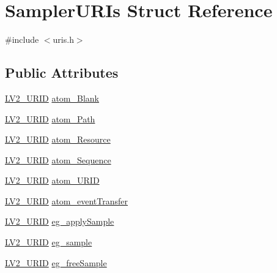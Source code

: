 \hypertarget{struct_sampler_u_r_is}{}\section{Sampler\+U\+R\+Is Struct Reference}
\label{struct_sampler_u_r_is}


{\ttfamily \#include $<$uris.\+h$>$}

\subsection*{Public Attributes}
\begin{DoxyCompactItemize}
\item 
\hyperlink{urid_8h_a5ff0630d245539e9f6dca10ff3c40fae}{L\+V2\+\_\+\+U\+R\+ID} \hyperlink{struct_sampler_u_r_is_a700696fb7f3df0b50fef56e3d120e373}{atom\+\_\+\+Blank}
\item 
\hyperlink{urid_8h_a5ff0630d245539e9f6dca10ff3c40fae}{L\+V2\+\_\+\+U\+R\+ID} \hyperlink{struct_sampler_u_r_is_afb869f2730563a38bffc0f295f8d8045}{atom\+\_\+\+Path}
\item 
\hyperlink{urid_8h_a5ff0630d245539e9f6dca10ff3c40fae}{L\+V2\+\_\+\+U\+R\+ID} \hyperlink{struct_sampler_u_r_is_ae9a6aa805ad14736e989a54a1daa5eff}{atom\+\_\+\+Resource}
\item 
\hyperlink{urid_8h_a5ff0630d245539e9f6dca10ff3c40fae}{L\+V2\+\_\+\+U\+R\+ID} \hyperlink{struct_sampler_u_r_is_abd1b15c33f02305b083915e452eb42b1}{atom\+\_\+\+Sequence}
\item 
\hyperlink{urid_8h_a5ff0630d245539e9f6dca10ff3c40fae}{L\+V2\+\_\+\+U\+R\+ID} \hyperlink{struct_sampler_u_r_is_a1cd02c8907b3fd7fcad0de0f24ef6d4a}{atom\+\_\+\+U\+R\+ID}
\item 
\hyperlink{urid_8h_a5ff0630d245539e9f6dca10ff3c40fae}{L\+V2\+\_\+\+U\+R\+ID} \hyperlink{struct_sampler_u_r_is_adcfc60f5f0d554e48eb3f19e3f1e4e9f}{atom\+\_\+event\+Transfer}
\item 
\hyperlink{urid_8h_a5ff0630d245539e9f6dca10ff3c40fae}{L\+V2\+\_\+\+U\+R\+ID} \hyperlink{struct_sampler_u_r_is_a4cf1584de00bc366850194cd674b6c31}{eg\+\_\+apply\+Sample}
\item 
\hyperlink{urid_8h_a5ff0630d245539e9f6dca10ff3c40fae}{L\+V2\+\_\+\+U\+R\+ID} \hyperlink{struct_sampler_u_r_is_ac56b8279bb585016e4d2711bbd794102}{eg\+\_\+sample}
\item 
\hyperlink{urid_8h_a5ff0630d245539e9f6dca10ff3c40fae}{L\+V2\+\_\+\+U\+R\+ID} \hyperlink{struct_sampler_u_r_is_a2329718c42b9eebfe995ee01b66fc8d3}{eg\+\_\+free\+Sample}

\end{DoxyCompactItemize}
